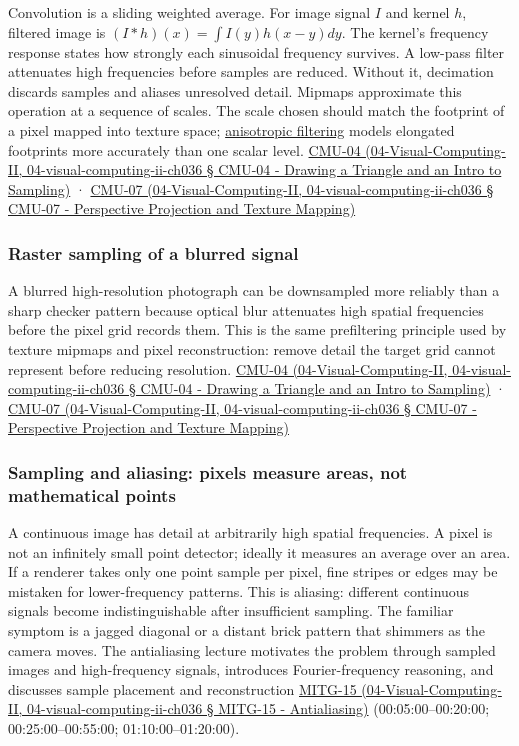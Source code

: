 Convolution is a sliding weighted average. For image signal \(I\) and kernel \(h\), filtered image is \((I*h)(x)=\int I(y)h(x-y)dy\). The kernel's frequency response states how strongly each sinusoidal frequency survives. A low-pass filter attenuates high frequencies before samples are reduced. Without it, decimation discards samples and aliases unresolved detail. Mipmaps approximate this operation at a sequence of scales. The scale chosen should match the footprint of a pixel mapped into texture space; \hyperref[appendix-d5b3c692d9f0]{anisotropic filtering} models elongated footprints more accurately than one scalar level. \href{}{CMU-04 (04-Visual-Computing-II, 04-visual-computing-ii-ch036 § CMU-04 - Drawing a Triangle and an Intro to Sampling)} · \href{}{CMU-07 (04-Visual-Computing-II, 04-visual-computing-ii-ch036 § CMU-07 - Perspective Projection and Texture Mapping)}

\subsubsection{Raster sampling of a blurred signal}\label{raster-sampling-of-a-blurred-signal}

A blurred high-resolution photograph can be downsampled more reliably than a sharp checker pattern because optical blur attenuates high spatial frequencies before the pixel grid records them. This is the same prefiltering principle used by texture mipmaps and pixel reconstruction: remove detail the target grid cannot represent before reducing resolution. \href{}{CMU-04 (04-Visual-Computing-II, 04-visual-computing-ii-ch036 § CMU-04 - Drawing a Triangle and an Intro to Sampling)} · \href{}{CMU-07 (04-Visual-Computing-II, 04-visual-computing-ii-ch036 § CMU-07 - Perspective Projection and Texture Mapping)}

\subsubsection{Sampling and aliasing: pixels measure areas, not mathematical points}\label{sampling-and-aliasing-pixels-measure-areas-not-mathematical-points}

A continuous image has detail at arbitrarily high spatial frequencies. A pixel is not an infinitely small point detector; ideally it measures an average over an area. If a renderer takes only one point sample per pixel, fine stripes or edges may be mistaken for lower-frequency patterns. This is aliasing: different continuous signals become indistinguishable after insufficient sampling. The familiar symptom is a jagged diagonal or a distant brick pattern that shimmers as the camera moves. The antialiasing lecture motivates the problem through sampled images and high-frequency signals, introduces Fourier-frequency reasoning, and discusses sample placement and reconstruction \href{}{MITG-15 (04-Visual-Computing-II, 04-visual-computing-ii-ch036 § MITG-15 - Antialiasing)} (00:05:00--00:20:00; 00:25:00--00:55:00; 01:10:00--01:20:00).

